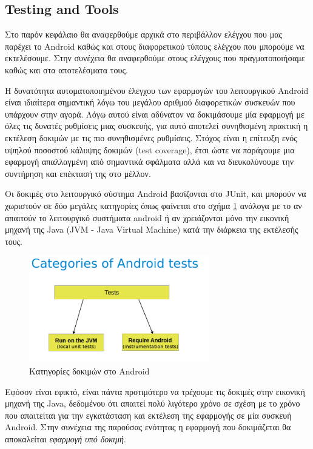 	\subsection{Testing and Tools}
	Στο παρόν κεφάλαιο θα αναφερθούμε αρχικά στο περιβάλλον ελέγχου που μας παρέχει το Android καθώς και στους διαφορετικού τύπους ελέγχου που μπορούμε να εκτελέσουμε. Στην συνέχεια θα αναφερθούμε στους ελέγχους που πραγματοποιήσαμε καθώς και στα αποτελέσματα τους.
	
	Η δυνατότητα αυτοματοποιημένου έλεγχου των εφαρμογών του λειτουργικού Android είναι ιδιαίτερα σημαντική λόγω του μεγάλου αριθμού διαφορετικών συσκευών που υπάρχουν στην αγορά. Λόγω αυτού είναι αδύνατον να δοκιμάσουμε μία εφαρμογή με όλες τις δυνατές ρυθμίσεις μιας συσκευής, για αυτό αποτελεί συνηθισμένη πρακτική η εκτέλεση δοκιμών με τις πιο συνηθισμένες ρυθμίσεις. Στόχος είναι η επίτευξη ενός υψηλού ποσοστού κάλυψης δοκιμών (test coverage), έτσι ώστε να παράγουμε μια εφαρμογή απαλλαγμένη από σημαντικά σφάλματα αλλά και να διευκολύνουμε την συντήρηση και επέκτασή της στο μέλλον.
	
	Οι δοκιμές στο λειτουργικό σύστημα Android βασίζονται στο JUnit, και μπορούν να χωριστούν σε δύο μεγάλες κατηγορίες όπως φαίνεται στο σχήμα \ref{fig:categories_of_android_tests} ανάλογα με το αν απαιτούν το λειτουργικό συστήματα android ή αν χρειάζονται μόνο την εικονική μηχανή της Java (JVM - Java Virtual Machine) κατά την διάρκεια της εκτέλεσής τους\cite{androidTesting}.
	
	\begin{figure}[h]
	    \centering
	    \includegraphics[width=0.7\textwidth]{categories_of_android_tests.png}
	    \caption{ Κατηγορίες δοκιμών στο Android}
	    \label{fig:categories_of_android_tests}
	\end{figure}
	
	Εφόσον είναι εφικτό, είναι πάντα προτιμότερο να τρέχουμε τις δοκιμές στην εικονική μηχανή της Java, δεδομένου ότι απαιτεί πολύ λιγότερο χρόνο σε σχέση με το χρόνο που απαιτείται για την εγκατάσταση και εκτέλεση της εφαρμογής σε μία συσκευή Android. Στην συνέχεια της παρούσας ενότητας η εφαρμογή που δοκιμάζεται θα αποκαλείται \textit{εφαρμογή υπό δοκιμή}.
